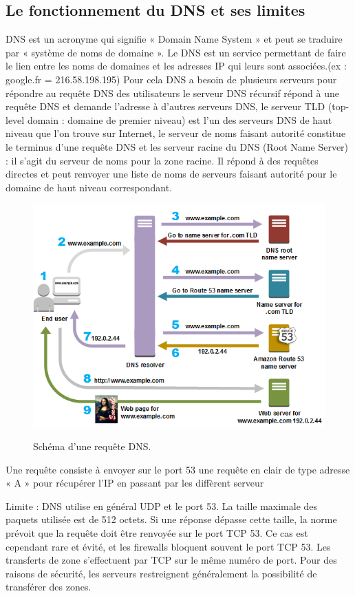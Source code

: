 \documentclass[a4paper,12pt]{article}
\begin{document}
	\subsection{Le fonctionnement du DNS et ses limites}
	DNS est un acronyme qui signifie « Domain Name System » et peut se traduire par « système de noms de domaine ».
	Le DNS est un service permettant de faire le lien entre les noms de domaines et les adresses IP qui leurs sont associées.(ex : google.fr = 216.58.198.195) 
	Pour cela DNS a besoin de plusieurs serveurs pour répondre au requête DNS des utilisateurs 
	le serveur DNS récursif répond à une requête DNS et demande l’adresse à d’autres serveurs DNS,  le serveur TLD (top-level domain : domaine de premier niveau) est l’un des serveurs DNS de haut niveau que l’on trouve sur Internet, le serveur de noms faisant autorité constitue le terminus d’une requête DNS et les serveur racine du DNS (Root Name Server) : il s’agit du serveur de noms pour la zone racine. Il répond à des requêtes directes et peut renvoyer une liste de noms de serveurs faisant autorité pour le domaine de haut niveau correspondant.
	\begin{figure}[H]
		\begin{center}
			{\includegraphics[scale=0.6]{Images/routes-traffic.png}}
		\end{center}
		\caption{Schéma d'une requête DNS.}
	\end{figure}
	Une requête consiste à envoyer sur le port 53 une requête en clair de type adresse « A » pour récupérer l’IP en passant par les diffèrent serveur 
	
	Limite :
	DNS utilise en général UDP et le port 53. La taille maximale des paquets utilisée est de 512 octets. Si une réponse dépasse cette taille, la norme prévoit que la requête doit être renvoyée sur le port TCP 53. Ce cas est cependant rare et évité, et les firewalls bloquent souvent le port TCP 53. Les transferts de zone s'effectuent par TCP sur le même numéro de port. Pour des raisons de sécurité, les serveurs restreignent généralement la possibilité de transférer des zones.
	
\end{document}
